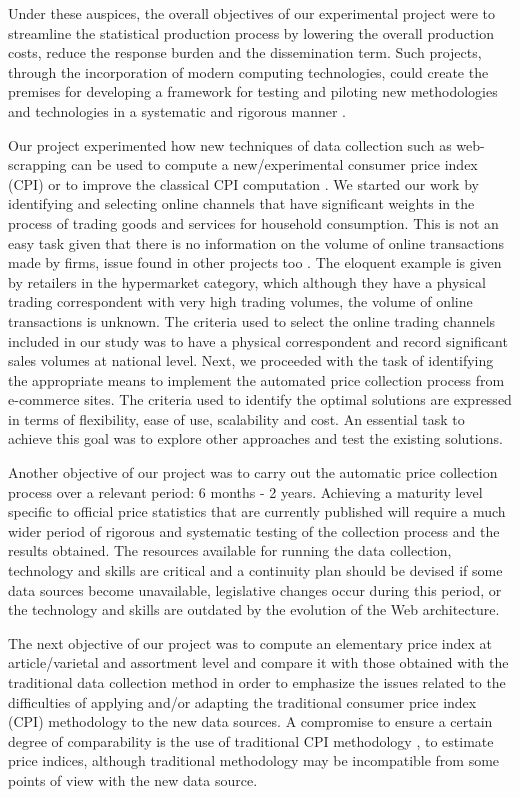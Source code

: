 \documentclass[]{article}
\begin{document}
Under these auspices, the overall objectives of our experimental project were to streamline the statistical production process by 
lowering the overall production costs, reduce the response burden and the dissemination term. Such projects, through the incorporation 
of modern computing technologies, could create the premises for developing a framework for testing and piloting new methodologies 
and technologies in a systematic and rigorous manner \cite{ons2017}. 


Our project experimented how new techniques of data collection such as web-scrapping can be used to compute a new/experimental 
consumer price index (CPI) or to improve the classical CPI computation \cite{otawa2017}. We started our work by identifying and 
selecting online channels that have significant weights in the process of trading goods and services for household consumption. 
This is not an easy task given that there is no information on the volume of online transactions made by firms, 
issue found in other projects too \cite{willenborg2017}. The eloquent 
example is given by retailers in the hypermarket category, which although they have a physical trading correspondent with very high 
trading volumes, the volume of online transactions is unknown. The criteria used to select the online trading channels included in 
our study was to have a physical correspondent and record significant sales volumes at national level. Next, we proceeded with the 
task of identifying the appropriate means to implement the automated price collection process from e-commerce sites. The criteria 
used to identify the optimal solutions are expressed in terms of flexibility, ease of use, scalability and cost. An essential task 
to achieve this goal was to explore other approaches and test the existing solutions. 


Another objective of our project was to carry out the automatic price collection process over a relevant period: 6 months - 2 years. 
Achieving a maturity level specific to official price statistics that are currently published will require a much wider period of 
rigorous and systematic testing of the collection process and the results obtained. The resources available for running the data 
collection, technology and skills are critical and a continuity plan should be devised if some data sources become unavailable, 
legislative changes occur during this period, or the technology and skills are outdated by the evolution of the Web architecture. 


The next objective of our project was to compute an elementary price index at article/varietal and assortment level and compare 
it with those obtained with the traditional data collection method in order to emphasize the issues related to the difficulties 
of applying and/or adapting the traditional consumer price index (CPI) methodology \cite{cpi} to the new data sources.  A compromise to 
ensure a certain degree of comparability is the use of traditional CPI methodology \cite{cpi2}, \cite{cpi3} to estimate price indices, although 
traditional methodology may be incompatible from some points of view with the new data source. 
\end{document}
